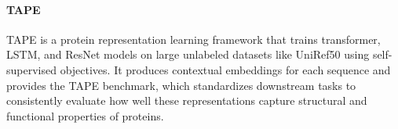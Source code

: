 \documentclass[]{Liebert_Author_revised}
\begin{document}
\paragraph{TAPE~\citeauthor{rao2019evaluating}}
TAPE is a protein representation learning framework that trains transformer, LSTM, and ResNet models on large unlabeled datasets like UniRef50 using self-supervised objectives. It produces contextual embeddings for each sequence and provides the TAPE benchmark, which standardizes downstream tasks to consistently evaluate how well these representations capture structural and functional properties of proteins.
\end{document}
